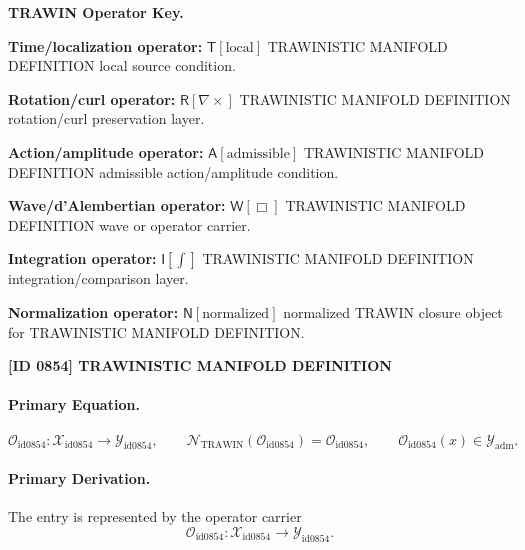 \par\vspace{0.45\baselineskip}
\noindent\begin{minipage}[t]{\linewidth}
\begingroup
\small
\raggedright
\textbf{TRAWIN Operator Key.}\par
\noindent\textbf{Time/localization operator:} $\mathsf{T}\!\left[\mathrm{local}\right]$ TRAWINISTIC MANIFOLD DEFINITION local source condition.\par
\noindent\textbf{Rotation/curl operator:} $\mathsf{R}\!\left[\nabla\times\right]$ TRAWINISTIC MANIFOLD DEFINITION rotation/curl preservation layer.\par
\noindent\textbf{Action/amplitude operator:} $\mathsf{A}\!\left[\mathrm{admissible}\right]$ TRAWINISTIC MANIFOLD DEFINITION admissible action/amplitude condition.\par
\noindent\textbf{Wave/d'Alembertian operator:} $\mathsf{W}\!\left[\Box\right]$ TRAWINISTIC MANIFOLD DEFINITION wave or operator carrier.\par
\noindent\textbf{Integration operator:} $\mathsf{I}\!\left[\int\right]$ TRAWINISTIC MANIFOLD DEFINITION integration/comparison layer.\par
\noindent\textbf{Normalization operator:} $\mathsf{N}\!\left[\mathrm{normalized}\right]$ normalized TRAWIN closure object for TRAWINISTIC MANIFOLD DEFINITION.\par
\endgroup
\end{minipage}

\clearpage
\noindent\textbf{[ID 0854] TRAWINISTIC MANIFOLD DEFINITION}\par
\vspace{0.35em}
\paragraph{Primary Equation.}
\[
\mathcal{O}_{\mathrm{id0854}}:\mathcal{X}_{\mathrm{id0854}}\longrightarrow \mathcal{Y}_{\mathrm{id0854}},\qquad
\mathcal{N}_{\mathrm{TRAWIN}}(\mathcal{O}_{\mathrm{id0854}})=\mathcal{O}_{\mathrm{id0854}},\qquad
\mathcal{O}_{\mathrm{id0854}}(x)\in\mathcal{Y}_{\mathrm{adm}}.
\]

\paragraph{Primary Derivation.} The entry is represented by the operator carrier\[
\mathcal{O}_{\mathrm{id0854}}:\mathcal{X}_{\mathrm{id0854}}\longrightarrow \mathcal{Y}_{\mathrm{id0854}}.
\]

